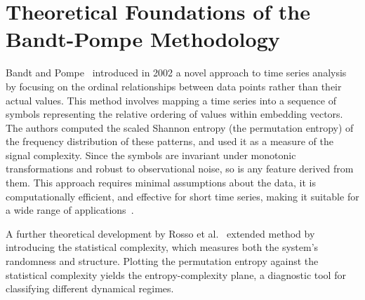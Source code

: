 
\section{Theoretical Foundations of the Bandt-Pompe Methodology}

Bandt and Pompe~\cite{PhysRevLett.88.174102} introduced in 2002 a novel approach to time series analysis by focusing on the ordinal relationships between data points rather than their actual values. 
This method involves mapping a time series into a sequence of symbols representing the relative ordering of values within embedding vectors. 
The authors computed the scaled Shannon entropy (the permutation entropy) of the frequency distribution of these patterns, and used it as a measure of the signal complexity.
Since the symbols are invariant under monotonic transformations and robust to observational noise, so is any feature derived from them.
This approach requires minimal assumptions about the data, it is computationally efficient, and effective for short time series, making it suitable for a wide range of applications~\cite{Zanin2012}.

A further theoretical development by Rosso et al.~\cite{Rosso2007} extended method by introducing the statistical complexity, which measures both the system's randomness and structure. 
Plotting the permutation entropy against the statistical complexity yields the entropy-complexity plane, a diagnostic tool for classifying different dynamical regimes.

